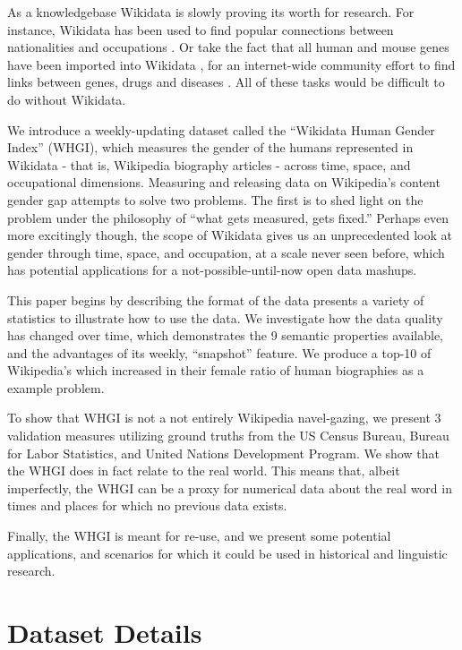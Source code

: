 \documentclass[letterpaper]{article}
\begin{document}
As a knowledgebase Wikidata is slowly proving its worth for research. For instance, Wikidata has been used to find popular connections between nationalities and occupations \cite{goldfarb_quantifying_2015}. Or take the fact that all human and mouse genes have been imported into Wikidata \cite{mitraka_wikidata:_2015}, for an internet-wide community effort to find links between genes, drugs and diseases \cite{burgstaller-muehlbacher_wikidata_2015}. All of these tasks would be difficult to do without Wikidata.

We introduce a weekly-updating dataset called the ``Wikidata Human Gender Index'' (WHGI), which measures the gender of the humans represented in Wikidata - that is, Wikipedia biography articles - across time, space, and occupational dimensions. Measuring and releasing data on Wikipedia's content gender gap attempts to solve two problems. The first is to shed light on the problem under the philosophy of ``what gets measured, gets fixed.'' Perhaps even more excitingly though, the scope of Wikidata gives us an unprecedented look at gender through time, space, and occupation, at a scale never seen before, which has potential applications for a not-possible-until-now open data mashups.

This paper begins by describing the format of the data presents a variety of statistics to illustrate how to use the data. We investigate how the data quality has changed over time, which demonstrates the 9 semantic properties available, and the advantages of its weekly, ``snapshot'' feature. We produce a top-10 of Wikipedia’s which increased in their female ratio of human biographies as a example problem. 

To show that WHGI is not a not entirely Wikipedia navel-gazing, we present 3 validation measures utilizing ground truths from the US Census Bureau, Bureau for Labor Statistics, and United Nations Development Program. We show that the WHGI does in fact relate to the real world. This means that, albeit imperfectly, the WHGI can be a proxy for numerical data about the real word in times and places for which no previous data exists.

Finally, the WHGI is meant for re-use, and we present some potential applications, and scenarios for which it could be used in historical and linguistic research.  

\section{Dataset Details}
\end{document}
